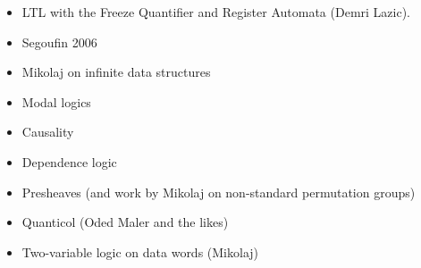 \begin{itemize}
 \item LTL with the Freeze Quantifier and Register Automata (Demri Lazic).
 \item Segoufin 2006
 \item Mikolaj on infinite data structures
 \item Modal logics
 \item Causality
 \item Dependence logic
 \item Presheaves (and work by Mikolaj on non-standard permutation groups)
 \item Quanticol (Oded Maler and the likes)
 \item Two-variable logic on data words (Mikolaj)
\end{itemize}



